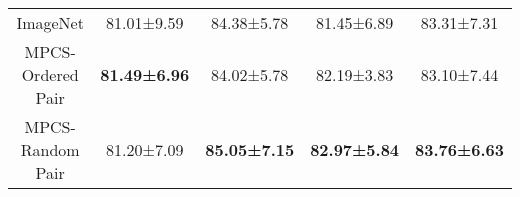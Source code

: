\documentclass[conference]{IEEEtran}
\begin{document}
\begin{table}[h]
{\begin{tabular}{c|cccc}
ImageNet        & \multicolumn{1}{c|}{{\color[HTML]{444444} 81.01±9.59}}                         & \multicolumn{1}{c|}{{\color[HTML]{444444} 84.38±5.78}}                          & \multicolumn{1}{c|}{{\color[HTML]{444444} 81.45±6.89}}                          & {\color[HTML]{444444} 83.31±7.31}                              \\
MPCS-Ordered Pair             & \multicolumn{1}{c|}{{\color[HTML]{444444} \textbf{81.49±6.96}}}                & \multicolumn{1}{c|}{{\color[HTML]{444444} 84.02±5.78}}                          & \multicolumn{1}{c|}{{\color[HTML]{444444} 82.19±3.83}}                          & {\color[HTML]{444444} 83.10±7.44}                              \\
MPCS-Random Pair              & \multicolumn{1}{c|}{{\color[HTML]{444444} 81.20±7.09}}                         & \multicolumn{1}{c|}{{\color[HTML]{444444} \textbf{85.05±7.15}}}                 & \multicolumn{1}{c|}{{\color[HTML]{444444} \textbf{82.97±5.84}}}                 & {\color[HTML]{444444} \textbf{83.76±6.63}}                     \\ \hline
\end{tabular}}
\label{x_mag_type1}
\end{table} \begin{table}[h]
\caption{Type 2 cross magnification performance  comparison of proposed methods (select one magnification in on which model was not trained). The values represent mean performance of a  magnification whereas trained on other magnifications (e.g. evaluated on 40x and trained on 100x, 200x, and 400x.}
\label{tab:results_ft80_cross_magnificaiton_type2}
\end{table}
\end{document}
